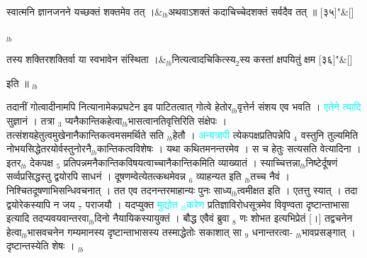 \documentclass[article,12pt,a4paper]{memoir}%
\newcommand{\quotelemma}[1]{\textcolor{cyan}{#1}}
\newcounter{parCount}
\begin{document}
	    
	    \stanza[\smallbreak]
	  स्वात्मनि ज्ञानजनने यच्छक्तं शक्तमेव तत् ।&{\tiny $_{lb}$}अथवाऽशक्तं कदाचिच्चेदशक्तं सर्वदैव तत् ॥ [३५]{\normalfontlatin\large\qquad{}"}\&[\smallbreak]
	  
	  
	  
	    \pstart  \leavevmode%
	    \hphantom{.}
	   {\tiny $_{lb}$} 
	    \pend%
	  
	    
	    \stanza[\smallbreak]
	  तस्य शक्तिरशक्तिर्वा या स्वभावेन संस्थिता ।&{\tiny $_{lb}$}नित्यत्वादचिकित्स्य{\tiny $_{2}$}स्य कस्तां क्षपयितुं क्षम [३६]{\normalfontlatin\large\qquad{}"}\&[\smallbreak]
	  
	  
	  
	    \pstart  \leavevmode%
	    \hphantom{.}
	   इति ॥
	{}
	\pend%
      {\tiny $_{lb}$}

	  
	  \pstart \leavevmode%
	तदानीं गोत्वादीनामपि नित्यानामेकप्रघटेन इव पाटितत्वात् गोत्वे हेतोर{\tiny $_{lb}$}वृत्तेर्न संशय एव भवति । \quotelemma{एतेने \cite[12a6]{vn-msN} त्यादि} सुज्ञानं । तत्रा {\tiny $_{3}$} प्यनैकान्तिकहेत्वा{\tiny $_{lb}$}भासत्वानतिवृत्तिरिति संक्षेपः । तत्संशयहेतुत्वमुखेनानैकान्तिकत्वमसमर्थिते सति {\tiny $_{lb}$}हेतौ । \quotelemma{अन्यत्रापी} त्येकपक्षप्रतिपन्नेपि {\tiny $_{4}$} वस्तुनि तुल्यमिति नोभयसिद्धेतरयोर्वस्तुनोरनै{\tiny $_{lb}$}कान्तिकत्वविशेषः । यथा कथितमनन्तरमेव । स च हेतुः सत्यसति वेत्यादिना । इतर{\tiny $_{lb}$}\leavevmode{} देकपक्ष {\tiny $_{5}$} प्रतिपन्नमनैकान्तिकविषयत्वाच्चानैकान्तिकमिति व्याख्यातं । स्याच्चित्तन्ना{\tiny $_{lb}$}निष्टेर्दूषणं सर्व्वप्रसिद्धस्तु द्वयोरपि साधनं । दूषणम्वेत्येतत्कथमेवन्न {\tiny $_{6}$} व्याहन्यत इति {\tiny $_{lb}$}तच्च नैवं । निश्चितदूषणाभिसन्धिवचनात् । तत एव तदनन्तरमाहान्यः पुनः साध्य{\tiny $_{lb}$}त्वमीक्षत इति । एतत्तु स्यात् । तदा द्वयोरेकस्यापि न जय {\tiny $_{7}$} पराजयौ । यदप्युक्त \quotelemma{मुद्योत {\tiny $_{lb}$}करेण} प्रतिज्ञाविरोधसूत्रमेव विवृण्वता दृष्टान्ताभासा इत्यादि तदप्यवयवान्तरवा{\tiny $_{lb}$}दिनो नैयायिकस्यायुक्तं । बौद्ध एवैवं ब्रुवा {\tiny $_{8}$} णः शोभत इत्यभिप्रेतं [।] तद्वचनेन हेत्वा{\tiny $_{lb}$}भासवचनेन गम्यमानस्य दृष्टान्ताभासस्य तस्माद्धेतोः सकाशात् सा {\tiny $_{9}$} \leavevmode{} धनान्तरत्वा- {\tiny $_{lb}$}भावप्रसङ्गात् । दृष्टान्तस्येति शेषः ।
	{}
	\pend%
      {\tiny $_{lb}$}
\end{document}
